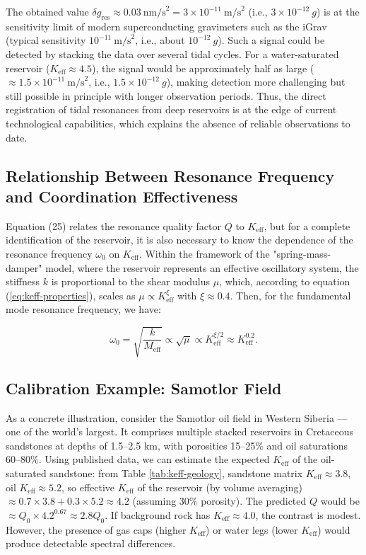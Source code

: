 \documentclass[12pt,a4paper]{article}
\theoremstyle{remark}
\newcommand{\Keff}{K_{\mathrm{eff}}}
\begin{document}
	The obtained value \(\delta g_{\text{res}} \approx 0.03\ \text{nm/s}^2 = 3 \times 10^{-11}\ \text{m/s}^2\) (i.e., \(3 \times 10^{-12}\ g\)) is at the sensitivity limit of modern superconducting gravimeters such as the iGrav (typical sensitivity \(10^{-11}\ \text{m/s}^2\), i.e., about \(10^{-12}\ g\)). Such a signal could be detected by stacking the data over several tidal cycles. For a water-saturated reservoir (\(\Keff \approx 4.5\)), the signal would be approximately half as large (\( \approx 1.5\times10^{-11}\ \text{m/s}^2\), i.e., \(1.5\times10^{-12}\ g\)), making detection more challenging but still possible in principle with longer observation periods. Thus, the direct registration of tidal resonances from deep reservoirs is at the edge of current technological capabilities, which explains the absence of reliable observations to date.
	
	\subsection{Relationship Between Resonance Frequency and Coordination Effectiveness}
	\label{subsec:frequency_keff}
	
	Equation (25) relates the resonance quality factor \(Q\) to \(\Keff\), but for a complete identification of the reservoir, it is also necessary to know the dependence of the resonance frequency \(\omega_0\) on \(\Keff\). Within the framework of the "spring-mass-damper" model, where the reservoir represents an effective oscillatory system, the stiffness \(k\) is proportional to the shear modulus \(\mu\), which, according to equation (\ref{eq:keff-properties}), scales as \(\mu \propto \Keff^{\xi}\) with \(\xi \approx 0.4\). Then, for the fundamental mode resonance frequency, we have:
	
	\begin{equation}
		\omega_0 = \sqrt{\frac{k}{M_{\text{eff}}}} \propto \sqrt{\mu} \propto \Keff^{\xi/2} \approx \Keff^{0.2}.
		\label{eq:omega_keff}
	\end{equation}
	
	\subsection{Calibration Example: Samotlor Field}
	
	As a concrete illustration, consider the Samotlor oil field in Western Siberia — one of the world's largest. It comprises multiple stacked reservoirs in Cretaceous sandstones at depths of 1.5–2.5 km, with porosities 15–25\% and oil saturations 60–80\%. Using published data, we can estimate the expected $\Keff$ of the oil-saturated sandstone: from Table \ref{tab:keff-geology}, sandstone matrix $\Keff \approx 3.8$, oil $\Keff \approx 5.2$, so effective $\Keff$ of the reservoir (by volume averaging) $\approx 0.7 \times 3.8 + 0.3 \times 5.2 \approx 4.2$ (assuming 30\% porosity). The predicted $Q$ would be $\approx Q_0 \times 4.2^{0.67} \approx 2.8 Q_0$. If background rock has $\Keff \approx 4.0$, the contrast is modest. However, the presence of gas caps (higher $\Keff$) or water legs (lower $\Keff$) would produce detectable spectral differences.
	
\end{document}
